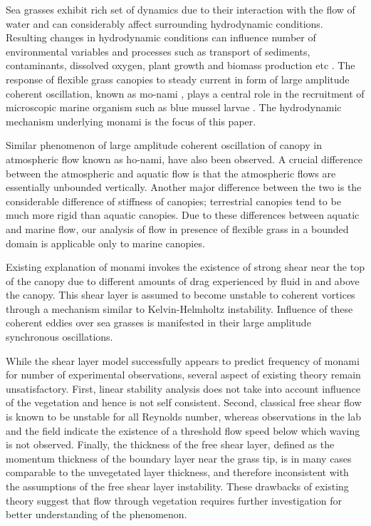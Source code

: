 \documentclass[aps,prl,twocolumn,showpacs,superscriptaddress,groupedaddress,10pt]{revtex4-1}  %
\begin{document}
Sea grasses exhibit rich set of dynamics due to their interaction with the flow of water and can considerably affect surrounding hydrodynamic conditions.
Resulting changes in hydrodynamic conditions can influence number of environmental variables and processes such as 
transport of sediments, contaminants, dissolved oxygen, plant growth and biomass production etc \cite{Fonseca87,Nepf99}. 
The response of flexible grass canopies to steady current in form of large amplitude coherent oscillation, known as mo-nami \cite{AckermanOkubo93}, plays a central role
in the recruitment of microscopic marine organism such as blue mussel larvae \cite{Grizzle96}. The hydrodynamic mechanism underlying monami is the focus of this paper. 

Similar phenomenon of large amplitude coherent oscillation of canopy in atmospheric flow known as ho-nami\cite{Inoue56,Raupach96}, have also been observed.
A crucial difference between the atmospheric and aquatic flow is that the atmospheric flows are essentially unbounded vertically\cite{Vivoni98,Nepf00}. Another major
difference between the two is the considerable difference of stiffness of canopies; terrestrial canopies tend to be much more rigid than aquatic canopies\cite{Vivoni98,Ghisal02}.
Due to these differences between aquatic and marine flow, our analysis of flow in presence of flexible grass in a bounded domain is applicable only to marine canopies. 
  
Existing explanation of monami invokes the existence of strong shear near the top of the canopy \cite{Ghisal02,Raupach96} due to
different amounts of drag experienced by fluid in and above the canopy. This shear layer is assumed to become unstable to coherent vortices through a mechanism similar to 
Kelvin-Helmholtz instability. Influence of these coherent eddies over sea grasses is manifested in their large amplitude synchronous oscillations.


While the shear layer model successfully appears to predict frequency of monami for number of experimental observations, several aspect of existing theory remain unsatisfactory. 
First, linear stability analysis\cite{Raupach96} does not take into account influence of the vegetation and hence is not self consistent. Second, classical free shear flow 
is known to be unstable for all Reynolds number\cite{drazin}, whereas observations in the lab\cite{Ghisal02} and the field\cite{Grizzle96} indicate the existence of a threshold flow speed below which waving is not observed. Finally, the thickness of the free shear layer, defined as the momentum thickness of the boundary layer near the grass tip, is in many cases comparable to the unvegetated layer thickness,
and therefore inconsistent with the assumptions of the free shear layer instability. These drawbacks of existing theory suggest that flow through vegetation requires further investigation for better understanding of the phenomenon.
\end{document}
